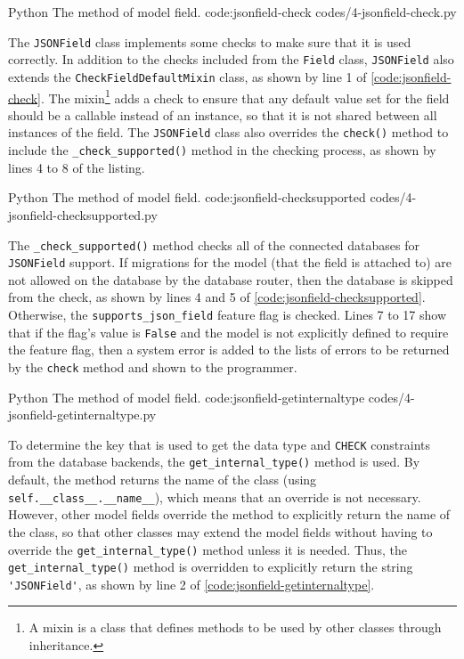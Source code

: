\listing
{Python}
{The  method of  model field.}
{code:jsonfield-check}
{codes/4-jsonfield-check.py}

The \verb|JSONField| class implements some checks to make sure that it is used
correctly. In addition to the checks included from the \verb|Field| class,
\verb|JSONField| also extends the \verb|CheckFieldDefaultMixin| class, as shown
by line 1 of \autoref{code:jsonfield-check}. The mixin\footnote{A mixin is a
class that defines methods to be used by other classes through inheritance.}
adds a check to ensure that any default value set for the field should be a
callable instead of an instance, so that it is not shared between all instances
of the field. The \verb|JSONField| class also overrides the \verb|check()|
method to include the \verb|_check_supported()| method in the checking process,
as shown by lines 4 to 8 of the listing.

\listing
{Python}
{The  method of  model field.}
{code:jsonfield-checksupported}
{codes/4-jsonfield-checksupported.py}

The \verb|_check_supported()| method checks all of the connected databases for
\verb|JSONField| support. If migrations for the model (that the field is
attached to) are not allowed on the database by the database router, then the
database is skipped from the check, as shown by lines 4 and 5 of
\autoref{code:jsonfield-checksupported}. Otherwise, the
\verb|supports_json_field| feature flag is checked. Lines 7 to 17 show that if
the flag's value is \verb|False| and the model is not explicitly defined to
require the feature flag, then a system error is added to the lists of errors
to be returned by the \verb|check| method and shown to the programmer.

\listing
{Python}
{The  method of  model field.}
{code:jsonfield-getinternaltype}
{codes/4-jsonfield-getinternaltype.py}

To determine the key that is used to get the data type and \verb|CHECK|
constraints from the database backends, the \verb|get_internal_type()| method
is used. By default, the method returns the name of the class (using
\verb|self.__class__.__name__|), which means that an override is not necessary.
However, other model fields override the method to explicitly return the name
of the class, so that other classes may extend the model fields without having
to override the \verb|get_internal_type()| method unless it is needed. Thus,
the \verb|get_internal_type()| method is overridden to explicitly return the
string \verb|'JSONField'|, as shown by line 2 of
\autoref{code:jsonfield-getinternaltype}.

